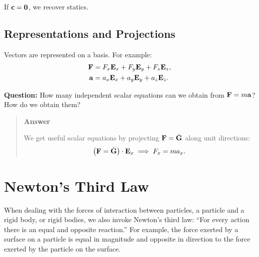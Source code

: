 \documentclass[
  letterpaper,
  DIV=11,
  numbers=noendperiod]{scrreprt}
\newcommand{\lp}{\left(}
\newcommand{\rp}{\right)}
\begin{document}
If \({\bf c}={\bf 0}\), we recover statics.

\subsection{Representations and
Projections}\label{representations-and-projections}

Vectors are represented on a basis. For example: \begin{align}
    {\bf F} &= F_x{\bf E}_x+F_y{\bf E}_y+ F_z{\bf E}_z,\\
    {\bf a} &= a_x{\bf E}_x+a_y{\bf E}_y+a_z{\bf E}_z.
\end{align}

\begin{tcolorbox}[enhanced jigsaw, arc=.35mm, bottomrule=.15mm, bottomtitle=1mm, breakable, colback=white, colbacktitle=quarto-callout-tip-color!10!white, colframe=quarto-callout-tip-color-frame, coltitle=black, left=2mm, leftrule=.75mm, opacityback=0, opacitybacktitle=0.6, rightrule=.15mm, title=\textcolor{quarto-callout-tip-color}{\faLightbulb}\hspace{0.5em}{Think!}, titlerule=0mm, toprule=.15mm, toptitle=1mm]

\textbf{Question:} How many independent scalar equations can we obtain
from \({\bf F}=m{\bf a}\)? How do we obtain them?

\begin{quote}
\textbf{Answer}

We get useful scalar equations by projecting \({\bf F} = \dot{\bf G}\)
along unit directions: \begin{align}
    \lp{\bf F}=\dot{\bf G}\rp\cdot{\bf E}_x \implies F_x = ma_x.
\end{align}
\end{quote}

\end{tcolorbox}

\section{Newton's Third Law}\label{newtons-third-law}

When dealing with the forces of interaction between particles, a
particle and a rigid body, or rigid bodies, we also invoke Newton's
third law: ``For every action there is an equal and opposite reaction.''
For example, the force exerted by a surface on a particle is equal in
magnitude and opposite in direction to the force exerted by the particle
on the surface.
\end{document}
